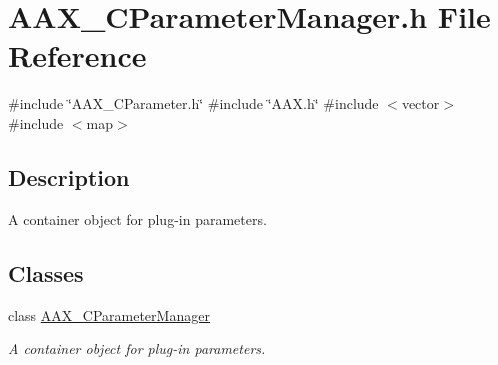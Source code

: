 \hypertarget{a00458}{}\section{A\+A\+X\+\_\+\+C\+Parameter\+Manager.\+h File Reference}
\label{a00458}
{\ttfamily \#include \char`\"{}A\+A\+X\+\_\+\+C\+Parameter.\+h\char`\"{}}\newline
{\ttfamily \#include \char`\"{}A\+A\+X.\+h\char`\"{}}\newline
{\ttfamily \#include $<$vector$>$}\newline
{\ttfamily \#include $<$map$>$}\newline


\subsection{Description}
A container object for plug-\/in parameters. 

\subsection*{Classes}
\begin{DoxyCompactItemize}
\item 
class \mbox{\hyperlink{a01545}{A\+A\+X\+\_\+\+C\+Parameter\+Manager}}
\begin{DoxyCompactList}\small\item\em A container object for plug-\/in parameters. \end{DoxyCompactList}\end{DoxyCompactItemize}

